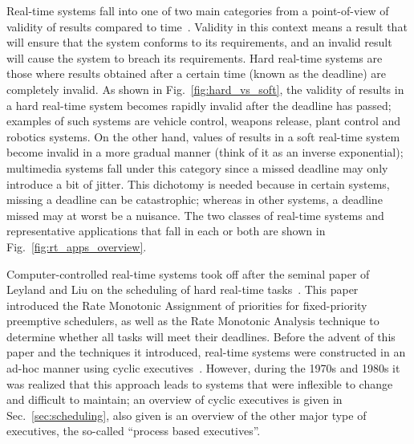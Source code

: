 Real-time systems fall into one of two main categories from a
point-of-view of validity of results compared to
time~\cite{jensen@ccej97}. Validity in this context means a result
that will ensure that the system conforms to its requirements, and an
invalid result will cause the system to breach its requirements. Hard
real-time systems are those where results obtained after a certain
time (known as the deadline) are completely invalid. As shown in
Fig.~\ref{fig:hard_vs_soft}, the validity of results in a hard
real-time system becomes rapidly invalid after the deadline has
passed; examples of such systems are vehicle control, weapons release,
plant control and robotics systems. On the other hand, values of
results in a soft real-time system become invalid in a more gradual
manner (think of it as an inverse exponential); multimedia systems
fall under this category since a missed deadline may only introduce a
bit of jitter. This dichotomy is needed because in certain
systems, missing a deadline can be catastrophic; whereas in other
systems, a deadline missed may at worst be a nuisance. The two classes
of real-time systems and representative applications that fall in each
or both are shown in Fig.~\ref{fig:rt_apps_overview}.

Computer-controlled real-time systems took off after the seminal paper
of Leyland and Liu on the scheduling of hard real-time
tasks~\cite{liu@jacm73}. This paper introduced the Rate Monotonic
Assignment of priorities for fixed-priority preemptive schedulers, as
well as the Rate Monotonic Analysis technique to determine whether all
tasks will meet their deadlines. Before the advent of this paper and
the techniques it introduced, real-time systems were constructed in an
ad-hoc manner using cyclic executives~\cite{audsley@rts95,
  laplante@rts95}. However, during the 1970s and 1980s it was realized
that this approach leads to systems that were inflexible to change and
difficult to maintain; an overview of cyclic executives is given in
Sec.~\ref{sec:scheduling}, also given is an overview of the other
major type of executives, the so-called ``process based executives''.

